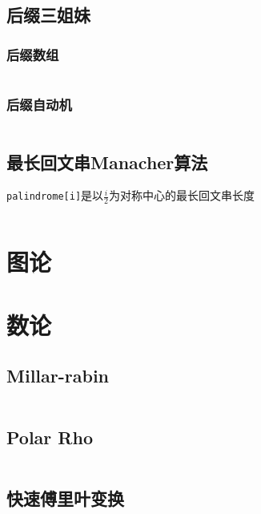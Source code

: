 \documentclass[a4paper]{article}
\newcommand{\cppcode}[1]{
    \inputminted[mathescape]{cpp}{source/#1}
}
\begin{document}
\cppcode{persistent-treap.cpp}

\subsection{后缀三姐妹}

\subsubsection{后缀数组}

\cppcode{suffix-array.cpp}

\subsubsection{后缀自动机}

\cppcode{suffix-automaton.cpp}

\subsection{最长回文串Manacher算法}

\texttt{palindrome[i]}是以$\frac{i}{2}$为对称中心的最长回文串长度

\cppcode{manacher.cpp}

\section{图论}

\section{数论}

\subsection{Millar-rabin}

\cppcode{millar-rabin.cpp}

\subsection{Polar Rho}

\cppcode{pollard-rho.cpp}

\subsection{快速傅里叶变换}

\cppcode{fast-fourier-transform.cpp}
\end{document}
